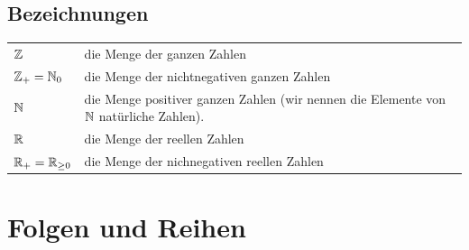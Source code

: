 

\section*{Bezeichnungen}

\begin{tabular}{lp{30em}}
	$\mathbb{Z}$ & die Menge der ganzen Zahlen
	\\ $\mathbb{Z}_+=\mathbb{N}_0$ & die Menge der nichtnegativen ganzen Zahlen
	\\ $\mathbb{N}$ & die Menge positiver ganzen Zahlen (wir nennen die Elemente von $\mathbb{N}$ natürliche Zahlen).
	\\ $\mathbb{R}$ & die Menge der reellen Zahlen
	\\ $\mathbb{R}_+=\mathbb{R}_{\ge 0}$ & die Menge der nichnegativen reellen Zahlen
\end{tabular}


\chapter{Folgen und Reihen}

